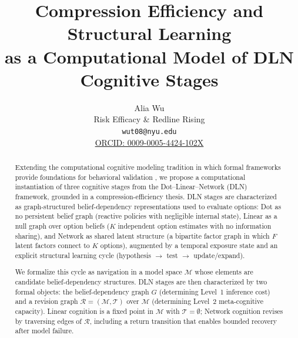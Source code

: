 \documentclass[11pt]{article}
\title{Compression Efficiency and Structural Learning\\as a Computational Model of DLN Cognitive Stages}
\author{
Alia Wu\\
Risk Efficacy \& Redline Rising\\
\texttt{wut08@nyu.edu}\\
\href{https://orcid.org/0009-0005-4424-102X}{ORCID: 0009-0005-4424-102X}
}
\date{}
\begin{document}
\maketitle

\begin{abstract}
Extending the computational cognitive modeling tradition in which formal frameworks provide foundations for behavioral validation \cite{Marr1982,ACTR2004,KempTenenbaum2008}, we propose a computational instantiation of three cognitive stages from the Dot--Linear--Network (DLN) framework, grounded in a compression-efficiency thesis. DLN stages are characterized as graph-structured belief-dependency representations used to evaluate options: Dot as no persistent belief graph (reactive policies with negligible internal state), Linear as a null graph over option beliefs ($K$ independent option estimates with no information sharing), and Network as shared latent structure (a bipartite factor graph in which $F$ latent factors connect to $K$ options), augmented by a temporal exposure state and an explicit structural learning cycle (hypothesis $\rightarrow$ test $\rightarrow$ update/expand).

We formalize this cycle as navigation in a model space $\mathcal{M}$ whose
elements are candidate belief-dependency structures.  DLN stages are then
characterized by two formal objects: the belief-dependency graph $G$
(determining Level~1 inference cost) and a revision graph
$\mathcal{R}=(\mathcal{M},\mathcal{T})$ over $\mathcal{M}$ (determining Level~2
meta-cognitive capacity).  Linear cognition is a fixed point in $\mathcal{M}$
with $\mathcal{T}=\emptyset$; Network cognition revises by traversing edges of
$\mathcal{R}$, including a return transition that enables bounded recovery after
model failure.


\end{abstract}
\end{document}
